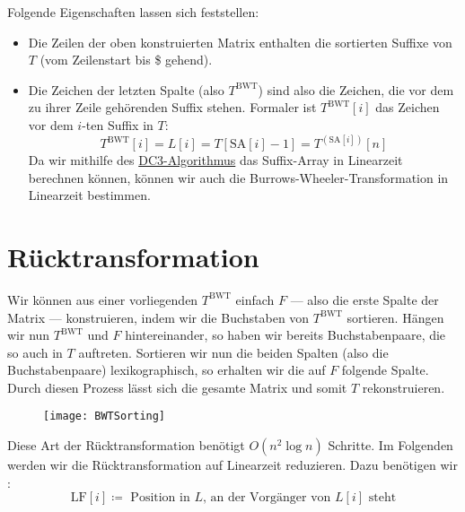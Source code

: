 Folgende Eigenschaften lassen sich feststellen:

\begin{itemize}
  \item Die Zeilen der oben konstruierten Matrix enthalten die sortierten Suffixe von \( T \) (vom Zeilenstart bis \$ gehend).
  \item Die Zeichen der letzten Spalte (also \( T^{\text{BWT}} \)) sind also die Zeichen, die vor dem zu ihrer Zeile gehörenden Suffix stehen. Formaler ist \( T^{\text{BWT}}[i] \) das Zeichen vor dem \( i \)-ten Suffix in \( T \):
  \begin{equation*}
    T^{\text{BWT}}[i] = L[i] = T[\text{SA}[i]-1] = T^{(\text{SA}[i])}[n]
  \end{equation*}
  Da wir mithilfe des \hyperref[sec:SALinear]{DC3-Algorithmus} das Suffix-Array in Linearzeit berechnen können, können wir auch die Burrows-Wheeler-Transformation in Linearzeit bestimmen.
\end{itemize}

\section{Rücktransformation}

\begin{minipage}{0.8\textwidth}
  Wir können aus einer vorliegenden \( T^{\text{BWT}} \) einfach \( F \) --- also die erste Spalte der Matrix --- konstruieren, indem wir die Buchstaben von \( T^{\text{BWT}} \) sortieren. Hängen wir nun \( T^{\text{BWT}} \) und \( F \) hintereinander, so haben wir bereits Buchstabenpaare, die so auch in \( T \) auftreten. Sortieren wir nun die beiden Spalten (also die Buchstabenpaare) lexikographisch, so erhalten wir die auf \( F \) folgende Spalte. Durch diesen Prozess lässt sich die gesamte Matrix und somit \( T \) rekonstruieren.
\end{minipage}
\hfill
\begin{minipage}{0.15\textwidth}
  \begin{figure}[H]
    \texttt{[image: BWTSorting]}
  \end{figure}
\end{minipage}

\clearpage

Diese Art der Rücktransformation benötigt \( O(n^2\log n) \) Schritte. Im Folgenden werden wir die Rücktransformation auf Linearzeit reduzieren. Dazu benötigen wir :
\begin{equation*}
  \text{LF}[i] \coloneqq \text{ Position in } L\text{, an der Vorgänger von } L[i] \text{ steht}
\end{equation*}

